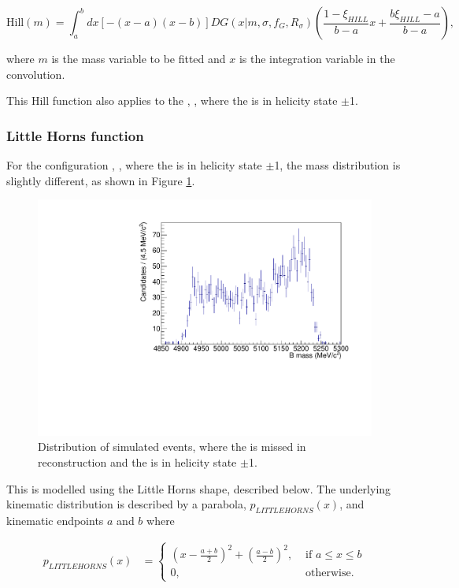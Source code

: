 \begin{equation}
\text{Hill}(m) = \int_a^b dx \left[-(x - a)(x - b)\right] DG(x|m,\sigma,f_G,R_{\sigma}) \left( \frac{1 - \xi_{HILL}}{b - a}x + \frac{b\xi_{HILL} - a}{b - a}\right),
\label{eqn:hill}
\end{equation}

where $m$ is the mass variable to be fitted and $x$ is the integration variable in the convolution.

This Hill function also applies to the \decay{\Bm}{\Dstarz\Kstarm}, \decay{\Dstarz}{\Dz\piz}, where the \Dstarz is in helicity state $\pm$1.

\subsubsection{Little Horns function}

For the configuration \decay{\Bm}{\Dstarz\Kstarm}, \decay{\Dstarz}{\Dz\gamma}, where the \Dstarz is in helicity state $\pm$1, the \Bm mass distribution is slightly different, as shown in Figure \ref{fig:littlehorns}.

\begin{figure}[h]
\centering
\includegraphics[width=0.5\linewidth]{figures/fitComponents/littlehorns.pdf}
\caption{Distribution of simulated \decay{\Bm}{(\decay{\Dstarz}{\Dz\gamma})\Kstarm} events, where the \Pgamma is missed in reconstruction and the \Dstarz is in helicity state $\pm$1.}
\label{fig:littlehorns}
\end{figure}

This is modelled using the Little Horns shape, described below. The underlying kinematic distribution is described by a parabola, $p_{LITTLEHORNS}(x)$, and kinematic endpoints $a$ and $b$ where

\begin{align}
p_{LITTLEHORNS}(x) &= \begin{cases}
\left(x - \frac{a+b}{2}\right)^2 + \left(\frac{a-b}{2}\right)^2, & \text{ if $a \leq x \leq b$}\\ 	
0, & \text{ otherwise.}
\end{cases} 
\end{align}

